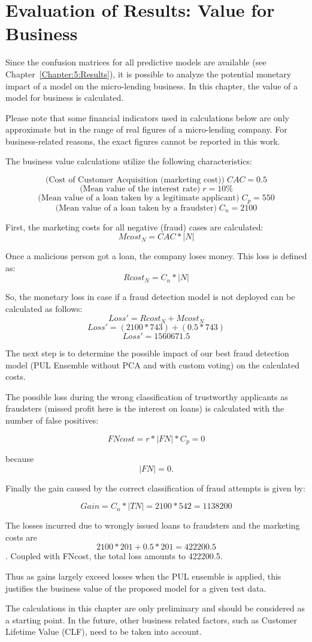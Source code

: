 \chapter{Evaluation of Results: Value for Business}\label{Chapter:6}
Since the confusion matrices for all predictive models are available (see Chapter~\ref{Chapter:5:Results}), it is possible to analyze the potential monetary impact of a model on the micro-lending business. In this chapter, the value of a model for business is calculated.

Please note that some financial indicators used in calculations below are only approximate but in the range of real figures of a micro-lending company. For business-related reasons, the exact figures cannot be reported in this work.

The business value calculations utilize the following characteristics:

\[\textrm{(Cost of Customer Acquisition (marketing cost))} \; CAC = 0.5  \]
\[\textrm{(Mean value of the interest rate)}\; r = 10\%  \]
\[\textrm{(Mean value of a loan taken by a legitimate applicant)}\; C_p = 550  \]
\[\textrm{(Mean value of a loan taken by a fraudster)}\; C_n = 2100  \]


First, the marketing costs for \textrm{all} negative (fraud) cases are calculated:
\[ Mcost_N = CAC * |N| \]

Once a malicious person got a loan, the company loses money. This loss is defined as:
\[ Rcost_N =   C_n * |N| \]

So, the monetary loss in case if a fraud detection model is not deployed can be calculated as follows:
\[ Loss' =  Rcost_N  +   Mcost_N  \]
\[ Loss' =  (2100 * 743) + (0.5 * 743) \]
\[ Loss' =  1560671.5\]

The next step is to determine the possible impact of our best fraud detection model (PUL Ensemble without PCA and with custom voting) on the calculated costs. 

The possible loss during the wrong classification of trustworthy applicants as fraudsters (missed profit here is the interest on loans) is calculated with the number of false positives:

\[ FNcost = r * |FN| * C_p = 0\]

because \[|FN| = 0.\]

Finally the gain caused by the correct classification of fraud attempts is given by:

\[Gain = C_n * |TN| = 2100 * 542 = 1138200\]

The losses incurred due to wrongly issued loans to fraudsters and the marketing costs are \[2100 * 201 + 0.5 * 201 = 422200.5\]. Coupled with FNcost, the total loss amounts to 422200.5.

Thus as gains largely exceed losses when the PUL ensemble is applied, this justifies the business value of the proposed model for a given test data.

The calculations in this chapter are only preliminary and should be considered as a starting point. In the future, other business related factors, such as Customer Lifetime Value (CLF), need to be taken into account.






